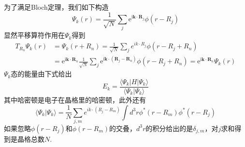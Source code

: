 \documentclass{article}
\numberwithin{equation}{subsection}
\begin{document}
为了满足Bloch定理，我们如下构造
\begin{equation}
    \Psi_{k}(r)=\frac{1}{\sqrt{N}} \sum_{j} \mathrm{e}^{\mathrm{i} \mathbf{k} \cdot \mathbf{R}_{j}} \phi\left(r-R_{j}\right)
\end{equation}
显然平移算符作用在$\Psi_k$得到
\begin{equation}
    \begin{split}
        T_{R_n}\Psi_k(r)&=\Psi_k(r+R_n)=\frac{1}{\sqrt{N}}\sum_{j}e^{ik\cdot R_j}\phi(r-R_j+R_n)\\
        &=\mathrm{e}^{\mathrm{i} \mathbf{k} \cdot \mathbf{R}_{n}} \frac{1}{\sqrt{N}} \sum_{j} \mathrm{e}^{\mathrm{i} \mathbf{k} \cdot\left(\mathbf{R}_{j}-\mathbf{R}_{n}\right)} \phi\left(r-R_{j}+R_{n}\right)=\mathrm{e}^{\mathrm{i} \mathbf{k} \cdot \mathbf{R}_{n}} \Psi_{k}(r)
    \end{split}
\end{equation}
$\Psi_k$态的能量由下式给出
\begin{equation}
    E_k=\frac{\langle \Psi_k|H|\Psi_k\rangle}{\langle\Psi_k|\Psi_k\rangle}
\end{equation}
其中哈密顿是电子在晶格里的哈密顿，此外还有
\begin{equation}
    \langle\Psi_k|\Psi_k\rangle=\frac{1}{N}\sum_{j,m}e^{ik\cdot(R_j-R_m)}\int d^3r\phi^*(r-R_m)\phi^*(r-R_j)
\end{equation}
如果忽略$\phi(r-R_j)$和$\phi(r-R_m)$的交叠，$d^3r$的积分给出的是$\delta_{j,m}$，对$j$求和得到是晶格总数$N$.
\end{document}
